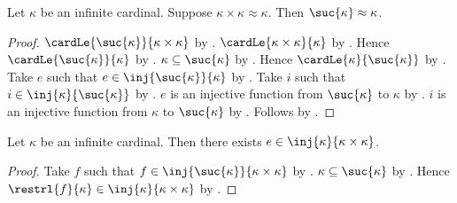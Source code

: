 \begin{proposition}\label{successor_equinumerous_from_square}
    Let $\kappa$ be an infinite cardinal.
    Suppose $\kappa\times\kappa\approx\kappa$.
    Then $\suc{\kappa}\approx\kappa$.
\end{proposition}
\begin{proof}
    $\cardLe{\suc{\kappa}}{\kappa\times\kappa}$
        by .
    $\cardLe{\kappa\times\kappa}{\kappa}$
        by .
    Hence $\cardLe{\suc{\kappa}}{\kappa}$
        by .
    $\kappa\subseteq\suc{\kappa}$ by .
    Hence $\cardLe{\kappa}{\suc{\kappa}}$ by .
    Take $e$ such that $e\in\inj{\suc{\kappa}}{\kappa}$
        by .
    Take $i$ such that $i\in\inj{\kappa}{\suc{\kappa}}$
        by .
    $e$ is an injective function from $\suc{\kappa}$ to $\kappa$
        by .
    $i$ is an injective function from $\kappa$ to $\suc{\kappa}$
        by .
    Follows by .
\end{proof}

\begin{proposition}\label{infinite_cardinal_injection_into_square}
    Let $\kappa$ be an infinite cardinal.
    Then there exists $e\in\inj{\kappa}{\kappa\times\kappa}$.
\end{proposition}
\begin{proof}
    Take $f$ such that
        $f\in\inj{\suc{\kappa}}{\kappa\times\kappa}$
        by .
    $\kappa\subseteq\suc{\kappa}$ by .
    Hence $\restrl{f}{\kappa}\in\inj{\kappa}{\kappa\times\kappa}$
        by .
\end{proof}

